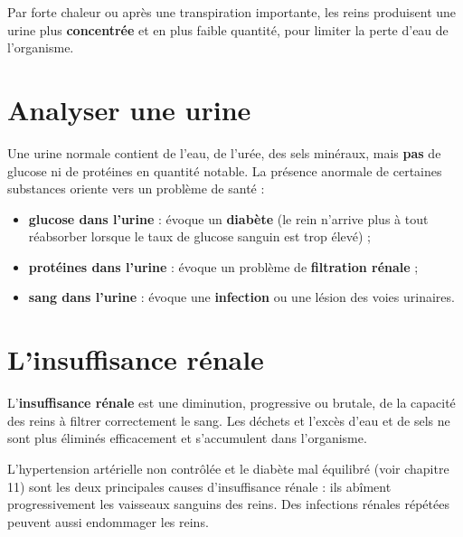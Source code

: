 \begin{remarque}
Par forte chaleur ou après une transpiration importante, les reins produisent une urine
plus \textbf{concentrée} et en plus faible quantité, pour limiter la perte d'eau de
l'organisme.
\end{remarque}

\section{Analyser une urine}

\begin{propriete}
Une urine normale contient de l'eau, de l'urée, des sels minéraux, mais \textbf{pas} de
glucose ni de protéines en quantité notable. La présence anormale de certaines substances
oriente vers un problème de santé :
\begin{itemize}
\item \textbf{glucose dans l'urine} : évoque un \textbf{diabète} (le rein n'arrive plus à
tout réabsorber lorsque le taux de glucose sanguin est trop élevé) ;
\item \textbf{protéines dans l'urine} : évoque un problème de \textbf{filtration
rénale} ;
\item \textbf{sang dans l'urine} : évoque une \textbf{infection} ou une lésion des voies
urinaires.
\end{itemize}
\end{propriete}

\section{L'insuffisance rénale}

\begin{definition}
L'\textbf{insuffisance rénale} est une diminution, progressive ou brutale, de la
capacité des reins à filtrer correctement le sang. Les déchets et l'excès d'eau et de
sels ne sont plus éliminés efficacement et s'accumulent dans l'organisme.
\end{definition}

\begin{propriete}
L'hypertension artérielle non contrôlée et le diabète mal équilibré (voir chapitre
11) sont les deux principales causes d'insuffisance rénale : ils abîment
progressivement les vaisseaux sanguins des reins. Des infections rénales répétées
peuvent aussi endommager les reins.
\end{propriete}

